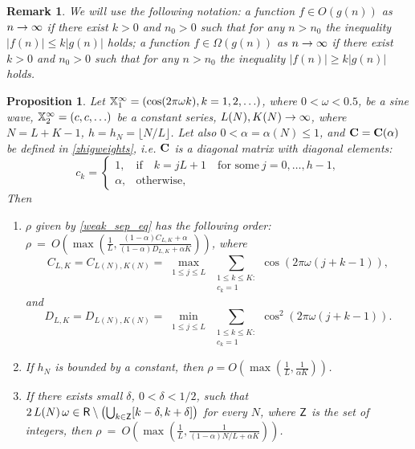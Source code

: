 \documentclass[sii]{ipart}
\newtheorem{proposition}{Proposition}
\newtheorem{remark}{Remark}
\begin{document}
\begin{remark}
	We will use the following notation:
a function $f \in O(g(n))$ as $n\rightarrow \infty$ if there exist $k>0$ and $n_0>0$ such that for any $n > n_0$ the inequality $|f(n)| \le k |g(n)|$ holds;
a function $f \in \Omega(g(n))$ as $n\rightarrow \infty$ if there exist $k>0$ and $n_0>0$ such that for any $n > n_0$ the inequality $|f(n)| \ge k |g(n)|$ holds.
\end{remark}

\begin{proposition}
	\label{prop:separ1}
	Let $\mathbb{X}_1^\infty = (\cos(2 \pi \omega k), k = 1, 2, \ldots)$, where $0<\omega <0.5$, be a sine wave, $\mathbb{X}_2^\infty = (c, c, \ldots)$ be a constant series,  $L(N),K(N)\rightarrow \infty$, where $N=L+K-1$, $h = h_N = \lfloor N/L \rfloor$. Let also $0<\alpha=\alpha(N)\le 1$, and $\mathbf{C}=\mathbf{C}(\alpha)$ be defined in \eqref{zhigweights}, i.e.  $\mathbf{C}$ is a diagonal matrix with diagonal elements:
	\begin{equation*}
	c_k = \begin{cases}
	1, & \text{if} \quad k = jL+1 \quad \text{for some} \ j = 0, \ldots, h-1,\\
	\alpha, & \text{otherwise},
	\end{cases}
	\end{equation*}
Then
	\begin{enumerate}
		\item $\rho$ given by \eqref{weak_sep_eq} has the following order: $\rho~=~O\left(\max\left(\frac{1}{L}, \frac{(1-\alpha)C_{L,K}+\alpha}{(1-\alpha)D_{L,K}+\alpha K}\right)\right)$, where
		\begin{equation*}
		C_{L,K} = C_{L(N),K(N)} = \max_{\substack{1 \le j \le L}}  \sum_{\substack{1 \le k \le K: \\ c_k = 1}}\cos(2 \pi \omega (j + k - 1)),		\end{equation*} and
		\begin{equation*}
		D_{L,K} = D_{L(N),K(N)} = \min_{\substack{1 \le j \le L}} \sum_{\substack{1 \le k \le K: \\ c_k = 1}}\cos^2(2 \pi \omega (j + k - 1)).
		\end{equation*}
		\item If $h_N$ is bounded by a constant, then $\rho=O\left(\max\left(\frac{1}{L}, \frac{1}{\alpha K}\right)\right)$.
		\item If there exists small $\delta$, $0 < \delta < 1/2$, such that $2\,L(N)\,\omega\in\mathsf{R} \setminus \left(\bigcup_{k \in \mathsf{Z}} [k - \delta, k + \delta] \right)$ for every $N$, where $\mathsf{Z}$ is the set of integers, then $\rho~=~O\left(\max\left(\frac{1}{L}, \frac{1}{(1-\alpha)N/L+\alpha K}\right)\right)$.
	\end{enumerate}
	
\end{proposition}
\end{document}
